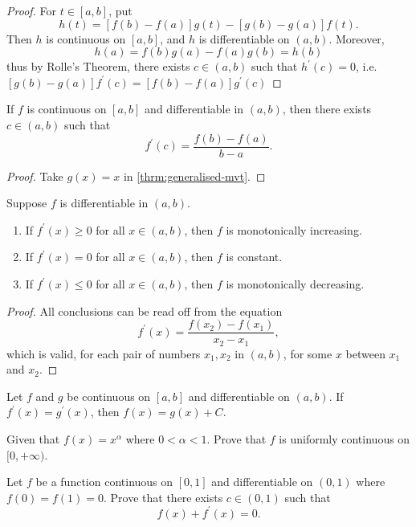 \begin{proof}
For $t\in[a,b]$, put
\[h(t)=[f(b)-f(a)]g(t)-[g(b)-g(a)]f(t).\]
Then $h$ is continuous on $[a,b]$, and $h$ is differentiable on $(a,b)$. Moreover,
\[h(a)=f(b)g(a)-f(a)g(b)=h(b)\]
thus by Rolle's Theorem, there exists $c\in(a,b)$ such that $h^\prime(c)=0$, i.e. $[g(b)-g(a)]f^\prime(c)=[f(b)-f(a)]g^\prime(c)$
\end{proof}

\begin{theorem}\label{thrm:mvt}
If $f$ is continuous on $[a,b]$ and differentiable in $(a,b)$, then there exists $c\in(a,b)$ such that
\[ f^\prime(c)=\frac{f(b)-f(a)}{b-a}. \]
\end{theorem}

\begin{proof}
Take $g(x)=x$ in \cref{thrm:generalised-mvt}.
\end{proof}

\begin{proposition}
Suppose $f$ is differentiable in $(a,b)$.
\begin{enumerate}[label=(\arabic*)]
\item If $f^\prime(x)\ge0$ for all $x\in(a,b)$, then $f$ is monotonically increasing.
\item If $f^\prime(x)=0$ for all $x\in(a,b)$, then $f$ is constant.
\item If $f^\prime(x)\le0$ for all $x\in(a,b)$, then $f$ is monotonically decreasing.
\end{enumerate}
\end{proposition}

\begin{proof}
All conclusions can be read off from the equation
\[f^\prime(x)=\frac{f(x_2)-f(x_1)}{x_2-x_1},\]
which is valid, for each pair of numbers $x_1,x_2$ in $(a,b)$, for some $x$ between
$x_1$ and $x_2$.
\end{proof}

\begin{exercise}
Let $f$ and $g$ be continuous on $[a,b]$ and differentiable on $(a,b)$. If $f^\prime(x)=g^\prime(x)$, then $f(x)=g(x)+C$.
\end{exercise}

\begin{exercise}
Given that $f(x)=x^\alpha$ where $0<\alpha<1$. Prove that $f$ is uniformly continuous on $[0,+\infty)$.
\end{exercise}

\begin{exercise}
Let $f$ be a function continuous on $[0,1]$ and differentiable on $(0,1)$ where $f(0)=f(1)=0$. Prove that there exists $c\in(0,1)$ such that
\[ f(x)+f^\prime(x)=0. \]
\end{exercise}

